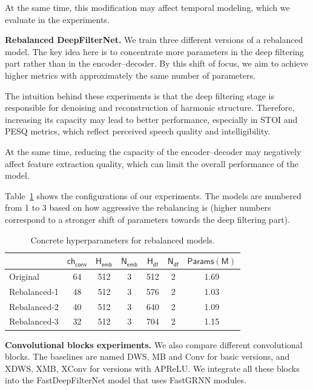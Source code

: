 \documentclass[a4paper,12pt]{extarticle}
\begin{document}
At the same time, this modification may affect temporal modeling, which we evaluate in the
experiments.

\textbf{Rebalanced DeepFilterNet.} We train three different versions of a rebalanced model. The key idea here is to
concentrate more parameters in the deep filtering part rather than in the encoder--decoder. By this shift of focus,
we aim to achieve higher metrics with approximately the same number of parameters. 

The intuition behind these experiments is that the deep filtering stage is responsible for denoising and 
reconstruction of harmonic structure. Therefore, increasing its capacity may lead to better performance, 
especially in STOI and PESQ metrics, which reflect perceived speech quality and intelligibility.

At the same time, reducing the capacity of the encoder--decoder may negatively affect feature extraction
quality, which can limit the overall performance of the model.

Table~\ref{table:rebalanced} shows the configurations of our experiments. The models are numbered from 1 
to 3 based on how aggressive the rebalancing is (higher numbers correspond to a stronger shift of 
parameters towards the deep filtering part).

\begin{table}[h]
	\caption{Concrete hyperparameters for rebalanced models.}
	\label{table:rebalanced}
	\footnotesize
	\centering
	\begin{tabular}{lcccccc}		
	\toprule
	 & $\mathsf{ch_{conv}}$ & $\mathsf{H_{emb}}$ & $\mathsf{N_{emb}}$ & $\mathsf{H_{df}}$ 
	 & $\mathsf{N_{df}}$ & $\mathsf{Params (M)}$ \\
	\midrule
	Original & 64 & 512 & 3 & 512 & 2 & 1.69 \\
	Rebalanced-1 & 48 & 512 & 3 & 576 & 2 & 1.03 \\
	Rebalanced-2 & 40 & 512 & 3 & 640 & 2 & 1.09 \\
	Rebalanced-3 & 32 & 512 & 3 & 704 & 2 & 1.15 \\
	\bottomrule
	\end{tabular}
\end{table}

\textbf{Convolutional blocks experiments.} We also compare different convolutional blocks. The baselines are named
DWS, MB and Conv for basic versions, and XDWS, XMB, XConv for versions with APReLU. We integrate all these blocks into
the FastDeepFilterNet model that uses FastGRNN modules.
\end{document}

